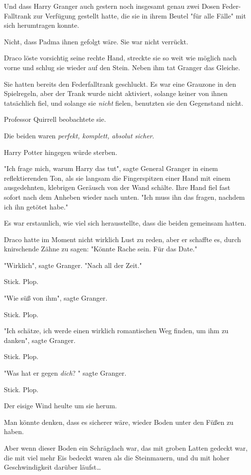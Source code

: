 {Und dass Harry Granger auch gestern noch insgesamt genau zwei Dosen Feder-Falltrank zur Verfügung gestellt hatte, die sie in ihrem Beutel "für alle Fälle" mit sich herumtragen konnte.

Nicht, dass Padma ihnen gefolgt wäre. Sie war nicht verrückt.

Draco löste vorsichtig seine rechte Hand, streckte sie so weit wie möglich nach vorne und schlug sie wieder auf den Stein. Neben ihm tat Granger das Gleiche.

Sie hatten bereits den Federfalltrank geschluckt. Es war eine Grauzone in den Spielregeln, aber der Trank wurde nicht aktiviert, solange keiner von ihnen tatsächlich fiel, und solange sie \emph{nicht} fielen, benutzten sie den Gegenstand nicht.

Professor Quirrell beobachtete sie.

Die beiden waren \emph{perfekt, komplett, absolut sicher}.

Harry Potter hingegen würde sterben.

"Ich frage mich, warum Harry das tut", sagte General Granger in einem reflektierenden Ton, als sie langsam die Fingerspitzen einer Hand mit einem ausgedehnten, klebrigen Geräusch von der Wand schälte. Ihre Hand fiel fast sofort nach dem Anheben wieder nach unten. "Ich muss ihn das fragen, nachdem ich ihn getötet habe."

Es war erstaunlich, wie viel sich herausstellte, dass die beiden gemeinsam hatten.

Draco hatte im Moment nicht wirklich Lust zu reden, aber er schaffte es, durch knirschende Zähne zu sagen: "Könnte Rache sein. Für das Date."

"Wirklich", sagte Granger. "Nach all der Zeit."

Stick. Plop.

"Wie süß von ihm", sagte Granger.

Stick. Plop.

"Ich schätze, ich werde einen wirklich romantischen Weg finden, um ihm zu danken", sagte Granger.

Stick. Plop.

"Was hat er gegen \emph{dich}? " sagte Granger.

Stick. Plop.

Der eisige Wind heulte um sie herum.

Man könnte denken, dass es sicherer wäre, wieder Boden unter den Füßen zu haben.

Aber wenn dieser Boden ein Schrägdach war, das mit groben Latten gedeckt war, die mit viel mehr Eis bedeckt waren als die Steinmauern, und du mit hoher Geschwindigkeit darüber läufst…

}
